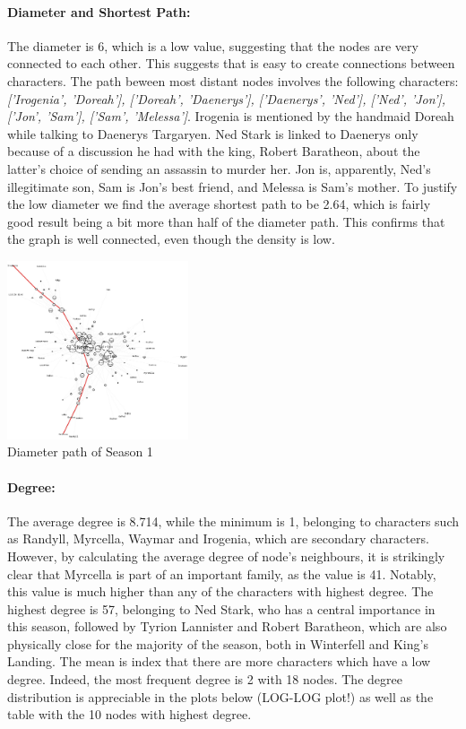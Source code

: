 \documentclass[10pt,twocolumn,letterpaper]{article}
\begin{document}
\paragraph{Diameter and Shortest Path:}

The diameter is 6, which is a low value, suggesting that the nodes are very connected to each other. This suggests that is easy to create connections between characters. The path beween most distant nodes involves the following characters: \textit{['Irogenia', 'Doreah'], ['Doreah', 'Daenerys'], ['Daenerys', 'Ned'], ['Ned', 'Jon'], ['Jon', 'Sam'], ['Sam', 'Melessa']}. Irogenia is mentioned by the handmaid Doreah while talking to Daenerys Targaryen. Ned Stark is linked to Daenerys only because of a discussion he had with the king, Robert Baratheon, about the latter's choice of sending an assassin to murder her. Jon is, apparently, Ned's illegitimate son, Sam is Jon's best friend, and Melessa is Sam's mother.
To justify the low diameter we find the average shortest path to be 2.64, which is fairly good result being a bit more than half of the diameter path. This confirms that the graph is well connected, even though the density is low.

\begin{center}
    \includegraphics[width=0.4\textwidth]{img/s1/diameter_path.jpg}\\
    \caption{\small{Diameter path of Season 1}}
\end{center}

\paragraph{Degree:}

The average degree is 8.714, while the minimum is 1, belonging to characters such as Randyll, Myrcella, Waymar and Irogenia, which are secondary characters. However, by calculating the average degree of node's neighbours, it is strikingly clear that Myrcella is part of an important family, as the value is 41. Notably, this value is much higher than any of the characters with highest degree. 
The highest degree is 57, belonging to Ned Stark, who has a central importance in this season, followed by Tyrion Lannister and Robert Baratheon, which are also physically close for the majority of the season, both in Winterfell and King's Landing. The mean is index that there are more characters which have a low degree. Indeed, the most frequent degree is 2 with 18 nodes. The degree distribution is appreciable in the plots below (LOG-LOG plot!) as well as the table with the 10 nodes with highest degree.
\end{document}
